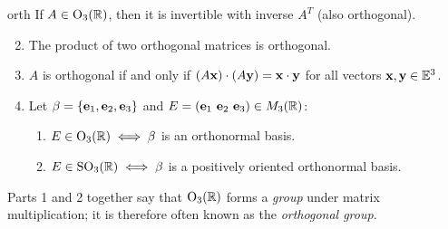\begin{lemm}{}{orth}
\exstart If $A\in\mathrm{O}_3(\mathbb{R})$, then it is invertible with inverse $A^T$ (also orthogonal).
\begin{enumerate}\setcounter{enumi}{1}
  \item The product of two orthogonal matrices is orthogonal.
  \item\label{lemm:orth3} $A$ is orthogonal if and only if $(A{\mathbf{x}})\cdot (A{\mathbf{y}})={\mathbf{x}}\cdot{\mathbf{y}}$ for all vectors ${\mathbf{x}},{\mathbf{y}}\in\mathbb{E}^3$.
  \item Let $\beta=\{{\mathbf{e}}_1,{\mathbf{e}}_2,{\mathbf{e}}_3\}$ and $E=({\mathbf{e}}_1\ {\mathbf{e}}_2\ {\mathbf{e}}_3)\in M_3(\mathbb{R})$:
  \begin{enumerate}
    \item $E\in\mathrm{O}_3(\mathbb{R})\iff \beta$ is an orthonormal basis.
    \item $E\in\mathrm{SO}_3(\mathbb{R})\iff \beta$ is a positively oriented orthonormal basis.
  \end{enumerate}
\end{enumerate}
\end{lemm}

Parts 1 and 2 together say that $\mathrm{O}_3(\mathbb{R})$ forms a \emph{group} under matrix multiplication; it is therefore often known as the \emph{orthogonal group.}

